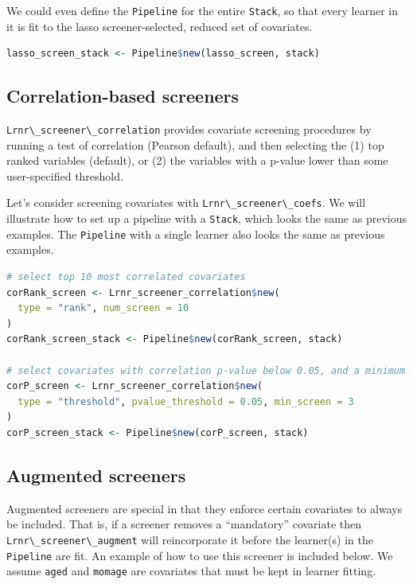 \documentclass[
  12pt, krantz2,
]{krantz}
\newcommand{\passthrough}[1]{#1}
\newcommand{\1}{\mathbbm{1}}
\theoremstyle{definition}
\theoremstyle{definition}
\theoremstyle{definition}
\theoremstyle{definition}
\theoremstyle{remark}
\begin{document}
We could even define the \passthrough{\lstinline!Pipeline!} for the entire \passthrough{\lstinline!Stack!}, so that every
learner in it is fit to the lasso screener-selected, reduced set of covariates.

\begin{lstlisting}[language=R]
lasso_screen_stack <- Pipeline$new(lasso_screen, stack)
\end{lstlisting}

\hypertarget{correlation-based-screeners}{%
\subsection{Correlation-based screeners}\label{correlation-based-screeners}}

\passthrough{\lstinline!Lrnr\_screener\_correlation!} provides covariate screening procedures by
running a test of correlation (Pearson default), and then selecting the (1) top
ranked variables (default), or (2) the variables with a p-value lower than
some user-specified threshold.

Let's consider screening covariates with \passthrough{\lstinline!Lrnr\_screener\_coefs!}. We will
illustrate how to set up a pipeline with a \passthrough{\lstinline!Stack!}, which looks the same as
previous examples. The \passthrough{\lstinline!Pipeline!} with a single learner also looks the same as
previous examples.

\begin{lstlisting}[language=R]
# select top 10 most correlated covariates
corRank_screen <- Lrnr_screener_correlation$new(
  type = "rank", num_screen = 10
)
corRank_screen_stack <- Pipeline$new(corRank_screen, stack)

# select covariates with correlation p-value below 0.05, and a minimum of 3
corP_screen <- Lrnr_screener_correlation$new(
  type = "threshold", pvalue_threshold = 0.05, min_screen = 3
)
corP_screen_stack <- Pipeline$new(corP_screen, stack)
\end{lstlisting}

\hypertarget{augmented-screeners}{%
\subsection{Augmented screeners}\label{augmented-screeners}}

Augmented screeners are special in that they enforce certain covariates to
always be included. That is, if a screener removes a ``mandatory'' covariate then
\passthrough{\lstinline!Lrnr\_screener\_augment!} will reincorporate it before the learner(s) in the
\passthrough{\lstinline!Pipeline!} are fit. An example of how to use this screener is included below.
We assume \passthrough{\lstinline!aged!} and \passthrough{\lstinline!momage!} are covariates that must be kept in learner
fitting.
\end{document}
